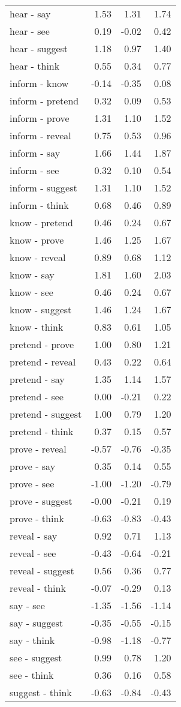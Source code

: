 \begin{longtable}{lrrr}
  hear - say & 1.53 & 1.31 & 1.74 \\ 
  hear - see & 0.19 & -0.02 & 0.42 \\ 
  hear - suggest & 1.18 & 0.97 & 1.40 \\ 
  hear - think & 0.55 & 0.34 & 0.77 \\ 
  inform - know & -0.14 & -0.35 & 0.08 \\ 
  inform - pretend & 0.32 & 0.09 & 0.53 \\ 
  inform - prove & 1.31 & 1.10 & 1.52 \\ 
  inform - reveal & 0.75 & 0.53 & 0.96 \\ 
  inform - say & 1.66 & 1.44 & 1.87 \\ 
  inform - see & 0.32 & 0.10 & 0.54 \\ 
  inform - suggest & 1.31 & 1.10 & 1.52 \\ 
  inform - think & 0.68 & 0.46 & 0.89 \\ 
  know - pretend & 0.46 & 0.24 & 0.67 \\ 
  know - prove & 1.46 & 1.25 & 1.67 \\ 
  know - reveal & 0.89 & 0.68 & 1.12 \\ 
  know - say & 1.81 & 1.60 & 2.03 \\ 
  know - see & 0.46 & 0.24 & 0.67 \\ 
  know - suggest & 1.46 & 1.24 & 1.67 \\ 
  know - think & 0.83 & 0.61 & 1.05 \\ 
  pretend - prove & 1.00 & 0.80 & 1.21 \\ 
  pretend - reveal & 0.43 & 0.22 & 0.64 \\ 
  pretend - say & 1.35 & 1.14 & 1.57 \\ 
  pretend - see & 0.00 & -0.21 & 0.22 \\ 
  pretend - suggest & 1.00 & 0.79 & 1.20 \\ 
  pretend - think & 0.37 & 0.15 & 0.57 \\ 
  prove - reveal & -0.57 & -0.76 & -0.35 \\ 
  prove - say & 0.35 & 0.14 & 0.55 \\ 
  prove - see & -1.00 & -1.20 & -0.79 \\ 
  prove - suggest & -0.00 & -0.21 & 0.19 \\ 
  prove - think & -0.63 & -0.83 & -0.43 \\ 
  reveal - say & 0.92 & 0.71 & 1.13 \\ 
  reveal - see & -0.43 & -0.64 & -0.21 \\ 
  reveal - suggest & 0.56 & 0.36 & 0.77 \\ 
  reveal - think & -0.07 & -0.29 & 0.13 \\ 
  say - see & -1.35 & -1.56 & -1.14 \\ 
  say - suggest & -0.35 & -0.55 & -0.15 \\ 
  say - think & -0.98 & -1.18 & -0.77 \\ 
  see - suggest & 0.99 & 0.78 & 1.20 \\ 
  see - think & 0.36 & 0.16 & 0.58 \\ 
  suggest - think & -0.63 & -0.84 & -0.43 \\ 
  \end{longtable}

